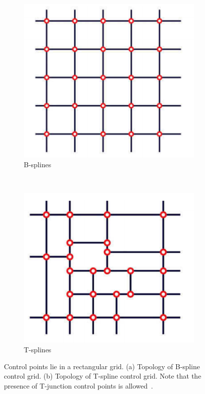 \begin{figure}[h]
    \centering
    \begin{subfigure}[b]{0.45\textwidth}
        \centering
        \includegraphics[width=\linewidth]{bspline-control-grid}
        \caption{B-splines}
    \end{subfigure}
    ~
    \begin{subfigure}[b]{0.45\textwidth}
        \centering
        \includegraphics[width=\linewidth]{tspline-control-grid}
        \caption{T-splines}
    \end{subfigure}   
    \caption{Control points lie in a rectangular grid. (a) Topology of B-spline control grid. (b) Topology of T-spline control grid. Note that the presence of T-junction control points is allowed~\cite{bazilevs_isogeometric_2010}.}\label{fig:Tspline-control-grid}
\end{figure}

